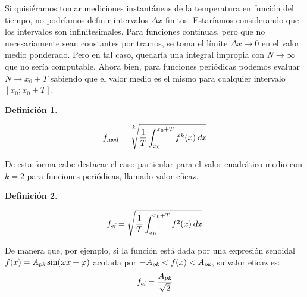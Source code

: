 \documentclass[a5paper,12pt,twoside]{book}
\newtheorem{defn}{{Definición}}[chapter]
\begin{document}
Si quisiéramos tomar mediciones instantáneas de la temperatura en función del tiempo, no podríamos definir intervalos $\Delta x$ finitos. Estaríamos considerando que los intervalos son infinitesimales. Para funciones continuas, pero que no necesariamente sean constantes por tramos, se toma el límite $\Delta x \to 0$ en el valor medio ponderado. Pero en tal caso, quedaría una integral impropia con $N\to\infty$ que no sería computable. Ahora bien, para funciones periódicas podemos evaluar $N \to x_0+T$ sabiendo que el valor medio es el mismo para cualquier intervalo $[x_0;x_0+T]$.

\begin{mdframed}[style=MyFrame1]
    \begin{defn}
    \end{defn}
    \begin{equation*}
        \ave{f} = \sqrt[\uproot{15} \scriptstyle k]{\frac{1}{T} \int_{x_0}^{x_0+T} f^k(x) \, \dif x}
    \end{equation*}
\end{mdframed}

De esta forma cabe destacar el caso particular para el valor cuadrático medio con $k=2$ para funciones periódicas, llamado valor eficaz.

\begin{mdframed}[style=MyFrame1]
    \begin{defn}
    \end{defn}
    \begin{equation*}
        {{{f}_\textsl{{ef}}}}=\sqrt{\dfrac{1}{T} \int_{x_0}^{x_0+T} f^2(x)\,\textsl{d} x}
    \end{equation*}
\end{mdframed}

De manera que, por ejemplo, si la función está dada por una expresión senoidal $f(x)={{{A}_\textsl{{pk}}}} \sin(\omega x + \varphi)$ acotada por $-{{{A}_\textsl{{pk}}}}<f(x)<{{{A}_\textsl{{pk}}}}$, su valor eficaz es:
\begin{equation*}
    {{{f}_\textsl{{ef}}}}=\frac{{{{A}_\textsl{{pk}}}}}{\sqrt{2}}
\end{equation*}

\begin{center}
\end{center}


\end{document}
